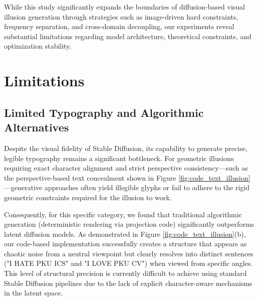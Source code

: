 \documentclass{article}
\begin{document}
While this study significantly expands the boundaries of diffusion-based visual illusion generation through strategies such as image-driven hard constraints, frequency separation, and cross-domain decoupling, our experiments reveal substantial limitations regarding model architecture, theoretical constraints, and optimization stability.

\section{Limitations}
\label{sec:limitations}

\subsection{Limited Typography and Algorithmic Alternatives}
Despite the visual fidelity of Stable Diffusion, its capability to generate precise, legible typography remains a significant bottleneck. For geometric illusions requiring exact character alignment and strict perspective consistency—such as the perspective-based text concealment shown in Figure \ref{fig:code_text_illusion}—generative approaches often yield illegible glyphs or fail to adhere to the rigid geometric constraints required for the illusion to work. 

Consequently, for this specific category, we found that traditional algorithmic generation (deterministic rendering via projection code) significantly outperforms latent diffusion models. As demonstrated in Figure \ref{fig:code_text_illusion}(b), our code-based implementation successfully creates a structure that appears as chaotic noise from a neutral viewpoint but clearly resolves into distinct sentences ("I HATE PKU ICS" and "I LOVE PKU CV") when viewed from specific angles. This level of structural precision is currently difficult to achieve using standard Stable Diffusion pipelines due to the lack of explicit character-aware mechanisms in the latent space.
\end{document}
